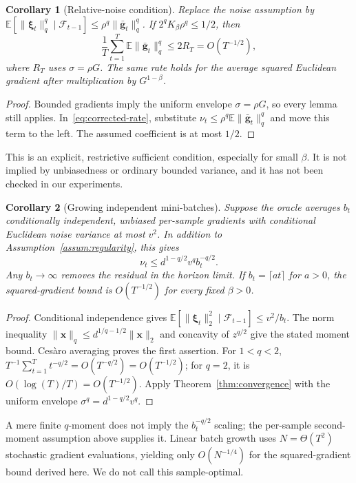 \documentclass[10pt,a4paper]{amsart}
\newtheorem{corollary}{Corollary}
\begin{document}
\begin{corollary}[Relative-noise condition]\label{cor:growth}
Replace the noise assumption by
$\mathbb E[\|\bm{\xi}_t\|_q^q\mid\mathcal F_{t-1}]\le\rho^q\|\bar{\mathbf{g}}_t\|_q^q$.
If $2^qK_\beta\rho^q\le1/2$, then
\begin{equation}
\frac1T\sum_{t=1}^T\mathbb E\|\bar{\mathbf{g}}_t\|_q^q\le2R_T=O(T^{-1/2}),
\end{equation}
where $R_T$ uses $\sigma=\rho G$. The same rate holds for the average squared Euclidean gradient after multiplication by $G^{1-\beta}$.
\end{corollary}
\begin{proof}
Bounded gradients imply the uniform envelope $\sigma=\rho G$, so every lemma still applies. In~\eqref{eq:corrected-rate}, substitute $\nu_t\le\rho^q\mathbb E\|\bar{\mathbf{g}}_t\|_q^q$ and move this term to the left. The assumed coefficient is at most $1/2$.
\end{proof}
This is an explicit, restrictive sufficient condition, especially for small $\beta$. It is not implied by unbiasedness or ordinary bounded variance, and it has not been checked in our experiments.

\begin{corollary}[Growing independent mini-batches]\label{cor:batch}
Suppose the oracle averages $b_t$ conditionally independent, unbiased per-sample gradients with conditional Euclidean noise variance at most $v^2$. In addition to Assumption~\ref{assum:regularity}, this gives
\begin{equation}
\nu_t\le d^{1-q/2}v^q b_t^{-q/2}.
\end{equation}
Any $b_t\to\infty$ removes the residual in the horizon limit. If $b_t=\lceil a t\rceil$ for $a>0$, the squared-gradient bound is $O(T^{-1/2})$ for every fixed $\beta>0$.
\end{corollary}
\begin{proof}
Conditional independence gives $\mathbb E[\|\bm{\xi}_t\|_2^2\mid\mathcal F_{t-1}]\le v^2/b_t$. The norm inequality $\|\mathbf{x}\|_q\le d^{1/q-1/2}\|\mathbf{x}\|_2$ and concavity of $z^{q/2}$ give the stated moment bound. Ces\`aro averaging proves the first assertion. For $1<q<2$, $T^{-1}\sum_{t=1}^Tt^{-q/2}=O(T^{-q/2})=O(T^{-1/2})$; for $q=2$, it is $O(\log(T)/T)=O(T^{-1/2})$. Apply Theorem~\ref{thm:convergence} with the uniform envelope $\sigma^q=d^{1-q/2}v^q$.
\end{proof}
A mere finite $q$-moment does not imply the $b_t^{-q/2}$ scaling; the per-sample second-moment assumption above supplies it. Linear batch growth uses $N=\Theta(T^2)$ stochastic gradient evaluations, yielding only $O(N^{-1/4})$ for the squared-gradient bound derived here. We do not call this sample-optimal.
\end{document}
